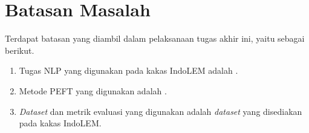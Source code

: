 \section{Batasan Masalah}
\label{sec:batasan-masalah}

Terdapat batasan yang diambil dalam pelaksanaan tugas akhir ini, yaitu sebagai berikut.

\begin{enumerate}
    \item Tugas NLP yang digunakan pada kakas IndoLEM adalah \nlptask.
    \item Metode PEFT yang digunakan adalah \methodPEFT.
    \item \textit{Dataset} dan metrik evaluasi yang digunakan adalah \textit{dataset} yang disediakan pada kakas IndoLEM.
\end{enumerate}

